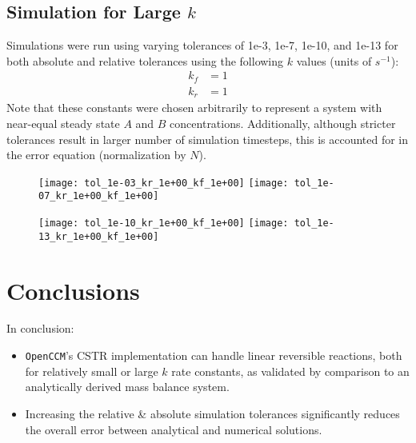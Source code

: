 \documentclass[a4paper,12pt]{article}
\begin{document}
\subsection{Simulation for Large $k$}

Simulations were run using varying tolerances of 1e-3, 1e-7, 1e-10, and 1e-13 for both absolute and relative tolerances using the following $k$ values (units of $s^{-1}$):
\begin{align}
    k_f &= 1\\
    k_r &= 1
\end{align}
Note that these constants were chosen arbitrarily to represent a system with near-equal steady state $A$ and $B$ concentrations. 
Additionally, although stricter tolerances result in larger number of simulation timesteps, this is accounted for in the error equation (normalization by $N$).
\begin{figure}[H]
    \texttt{[image: tol\_1e-03\_kr\_1e+00\_kf\_1e+00]}\hfill
    \texttt{[image: tol\_1e-07\_kr\_1e+00\_kf\_1e+00]}
\end{figure}
\begin{figure}[H]
    \texttt{[image: tol\_1e-10\_kr\_1e+00\_kf\_1e+00]}\hfill
    \texttt{[image: tol\_1e-13\_kr\_1e+00\_kf\_1e+00]}
\end{figure}

\section{Conclusions}

In conclusion:
\begin{itemize}
	\item \texttt{OpenCCM}'s CSTR implementation can handle linear reversible reactions, both for relatively small or large $k$ rate constants, as validated by comparison to an analytically derived mass balance system.
	\item Increasing the relative \& absolute simulation tolerances significantly reduces the overall error between analytical and numerical solutions.
\end{itemize}
\end{document}

